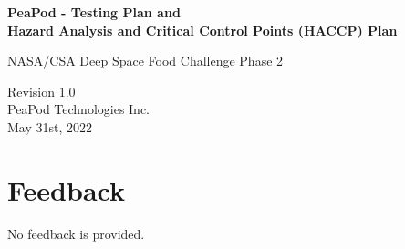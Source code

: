 \documentclass{../tex/report}
\begin{document}
\begin{titlepage}
    \begin{center}
        \vspace*{1.2cm}

        \textbf{\large{PeaPod - Testing Plan and\\Hazard Analysis and Critical Control Points (HACCP) Plan}}

        \vspace{0.5cm}

        NASA/CSA Deep Space Food Challenge Phase 2

        \vfill
        
        \vspace{.75cm}

        Revision 1.0\\
        PeaPod Technologies Inc.\\
        May 31st, 2022

    \end{center}
\end{titlepage}

\thispagestyle{plain}

\tableofcontents
\clearpage



\clearpage



\clearpage

\section{Feedback}

No feedback is provided.


\clearpage



\end{document}
